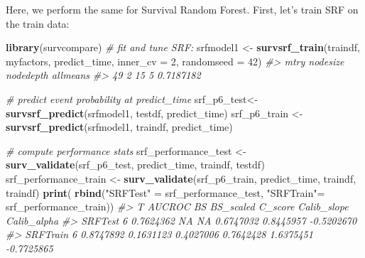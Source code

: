 \documentclass[
]{article}
\newenvironment{Shaded}{\begin{snugshade}}{\end{snugshade}}
\newcommand{\AttributeTok}[1]{\textcolor[rgb]{0.13,0.29,0.53}{#1}}
\newcommand{\CommentTok}[1]{\textcolor[rgb]{0.56,0.35,0.01}{\textit{#1}}}
\newcommand{\DecValTok}[1]{\textcolor[rgb]{0.00,0.00,0.81}{#1}}
\newcommand{\FunctionTok}[1]{\textcolor[rgb]{0.13,0.29,0.53}{\textbf{#1}}}
\newcommand{\NormalTok}[1]{#1}
\newcommand{\OtherTok}[1]{\textcolor[rgb]{0.56,0.35,0.01}{#1}}
\newcommand{\StringTok}[1]{\textcolor[rgb]{0.31,0.60,0.02}{#1}}
\begin{document}
Here, we perform the same for Survival Random Forest. First, let's train
SRF on the train data:

\begin{Shaded}
\begin{Highlighting}[]
\FunctionTok{library}\NormalTok{(survcompare)}
\CommentTok{\# fit and tune SRF:}
\NormalTok{srfmodel1 }\OtherTok{\textless{}{-}}
  \FunctionTok{survsrf\_train}\NormalTok{(traindf,}
\NormalTok{                myfactors,}
\NormalTok{                predict\_time,}
                \AttributeTok{inner\_cv =} \DecValTok{2}\NormalTok{,}
                \AttributeTok{randomseed =} \DecValTok{42}\NormalTok{)}
\CommentTok{\#\textgreater{}    mtry nodesize nodedepth  allmeans}
\CommentTok{\#\textgreater{} 49    2       15         5 0.7187182}

\CommentTok{\# predict event probability at predict\_time}
\NormalTok{srf\_p6\_test}\OtherTok{\textless{}{-}} \FunctionTok{survsrf\_predict}\NormalTok{(srfmodel1, testdf, predict\_time)}
\NormalTok{srf\_p6\_train }\OtherTok{\textless{}{-}} \FunctionTok{survsrf\_predict}\NormalTok{(srfmodel1, traindf, predict\_time)}

\CommentTok{\# compute performance stats }
\NormalTok{srf\_performance\_test }\OtherTok{\textless{}{-}} 
  \FunctionTok{surv\_validate}\NormalTok{(srf\_p6\_test, predict\_time, traindf, testdf)}
\NormalTok{srf\_performance\_train }\OtherTok{\textless{}{-}} 
  \FunctionTok{surv\_validate}\NormalTok{(srf\_p6\_train, predict\_time, traindf, traindf)}
\FunctionTok{print}\NormalTok{(}
  \FunctionTok{rbind}\NormalTok{(}\StringTok{"SRFTest"} \OtherTok{=}\NormalTok{ srf\_performance\_test,}
        \StringTok{"SRFTrain"}\OtherTok{=}\NormalTok{ srf\_performance\_train))}
\CommentTok{\#\textgreater{}          T    AUCROC        BS BS\_scaled   C\_score Calib\_slope Calib\_alpha}
\CommentTok{\#\textgreater{} SRFTest  6 0.7624362        NA        NA 0.6747032   0.8445957  {-}0.5202670}
\CommentTok{\#\textgreater{} SRFTrain 6 0.8747892 0.1631123 0.4027006 0.7642428   1.6375451  {-}0.7725865}


\end{Highlighting}
\end{Shaded}
\end{document}
